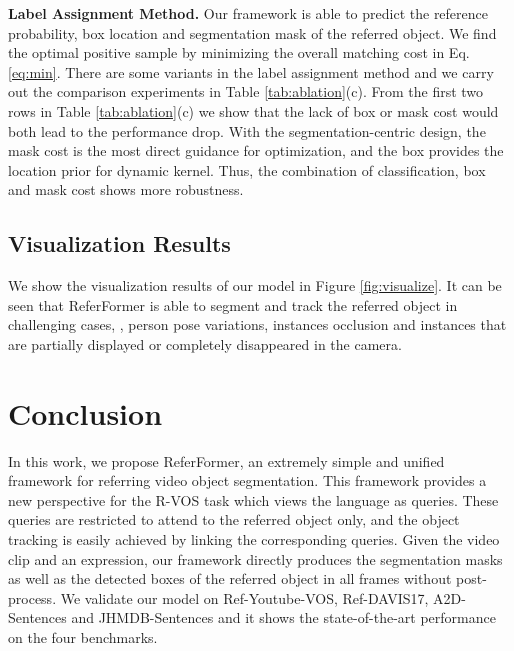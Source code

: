 \documentclass[10pt,twocolumn,letterpaper]{article}
\newcommand{\myparagraph}[1]{{\vspace{.5em} \noindent \bf #1}}
\begin{document}
{\myparagraph{Label Assignment Method.} Our framework is able to predict the reference probability, box location and segmentation mask of the referred object. We find the optimal positive sample by minimizing the overall matching cost in Eq.\ref{eq:min}. There are some variants in the label assignment method and we carry out the comparison experiments in Table \ref{tab:ablation}(c). From the first two rows in Table \ref{tab:ablation}(c) we show that the lack of box or mask cost would both lead to the performance drop. With the segmentation-centric design, the mask cost is the most direct guidance for optimization, and the box provides the location prior for dynamic kernel. Thus, the combination of classification, box and mask cost shows more robustness.
\vspace{-2mm}



\subsection{Visualization Results}

We show the visualization results of our model in Figure \ref{fig:visualize}. It can be seen that ReferFormer is able to segment and track the referred object in challenging cases, \eg, person pose variations, instances occlusion and instances that are partially displayed or completely disappeared in the camera.
\vspace{-4mm}

 

\section{Conclusion}

In this work, we propose ReferFormer, an extremely simple and unified framework for referring video object segmentation. This framework provides a new perspective for the R-VOS task which views the language as queries. These queries are restricted to attend to the referred object only, and the object tracking is easily achieved by linking the corresponding queries. Given the video clip and an expression, our framework directly produces the segmentation masks as well as the detected boxes of the referred object in all frames without post-process. We validate our model on Ref-Youtube-VOS, Ref-DAVIS17, A2D-Sentences and JHMDB-Sentences and it shows the state-of-the-art performance on the four benchmarks.

\iffalse

}
\end{document}
